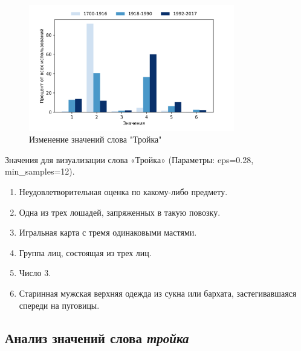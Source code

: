 \documentclass[LI,VKR]{HSEUniversity}
\begin{document}
%

\begin{figure}[H]
	\centering
	\includegraphics[width=0.8\textwidth]{img/visualizations/trojka_minimal}
	\caption{Изменение значений слова "Тройка"}
	\label{fig:Тройка}
\end{figure}

Значения для визуализации слова «Тройка» (Параметры: eps=0.28, min\_samples=12).

\begin{enumerate}
    \item Неудовлетворительная оценка по какому-либо предмету.
    \item Одна из трех лошадей, запряженных в такую повозку.
    \item Игральная карта с тремя одинаковыми мастями.
    \item Группа лиц, состоящая из трех лиц.
    \item Число 3.
    \item Старинная мужская верхняя одежда из сукна или бархата, застегивавшаяся спереди на пуговицы.
\end{enumerate}

\subsection*{Анализ значений слова \textit{тройка}}
\end{document}
